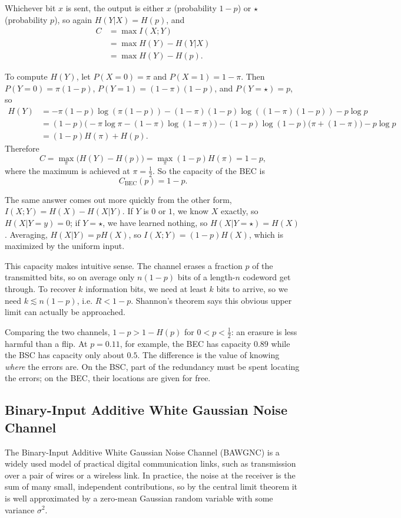 Whichever bit \(x\) is sent, the output is either \(x\) (probability \(1-p\)) or \(\star\) (probability \(p\)), so again \(H(Y|X) = H(p)\), and
\begin{align*}
C &= \max I(X;Y) \\
  &= \max H(Y) - H(Y|X) \\
  &= \max H(Y) - H(p).
\end{align*}

To compute \(H(Y)\), let \(P(X=0) = \pi\) and \(P(X=1) = 1- \pi\). Then \(P(Y=0) = \pi (1-p)\), \(P(Y=1) = (1-\pi) (1-p)\), and \(P(Y=\star)= p\), so
\begin{align*}
    H(Y) &= - \pi (1-p) \log (\pi (1-p)) - (1-\pi) (1-p) \log ((1-\pi) (1-p)) - p \log p \\
         &= (1-p)\big(-\pi \log \pi - (1-\pi)  \log (1-\pi)\big) - (1-p) \log (1-p)\big(\pi + (1-\pi)\big)  - p \log p\\
         &= (1-p) H(\pi) + H(p).
\end{align*}
Therefore
\[C = \max_\pi \big(H(Y) - H(p)\big) = \max_\pi (1-p) H(\pi) = 1-p,\]
where the maximum is achieved at \(\pi = \frac{1}{2}\). So the capacity of the BEC is
\[C_{\mathrm{BEC}}(p) = 1-p.\]

The same answer comes out more quickly from the other form, \(I(X;Y) = H(X) - H(X|Y)\). If \(Y\) is \(0\) or \(1\), we know \(X\) exactly, so \(H(X|Y=y) = 0\); if \(Y = \star\), we have learned nothing, so \(H(X|Y=\star) = H(X)\). Averaging, \(H(X|Y) = pH(X)\), so \(I(X;Y) = (1-p)H(X)\), which is maximized by the uniform input.

This capacity makes intuitive sense. The channel erases a fraction \(p\) of the transmitted bits, so on average only \(n(1-p)\) bits of a length-\(n\) codeword get through. To recover \(k\) information bits, we need at least \(k\) bits to arrive, so we need \(k \lesssim n(1-p)\), i.e. \(R < 1-p\). Shannon's theorem says this obvious upper limit can actually be approached.

Comparing the two channels, \(1-p > 1-H(p)\) for \(0 < p < \frac{1}{2}\): an erasure is less harmful than a flip. At \(p = 0.11\), for example, the BEC has capacity \(0.89\) while the BSC has capacity only about \(0.5\). The difference is the value of knowing \emph{where} the errors are. On the BSC, part of the redundancy must be spent locating the errors; on the BEC, their locations are given for free.


\subsection{Binary-Input Additive White Gaussian Noise Channel}
The Binary-Input Additive White Gaussian Noise Channel (BAWGNC) is a widely used model of practical digital communication links, such as transmission over a pair of wires or a wireless link. In practice, the noise at the receiver is the sum of many small, independent contributions, so by the central limit theorem it is well approximated by a zero-mean Gaussian random variable with some variance \(\sigma^2\).

